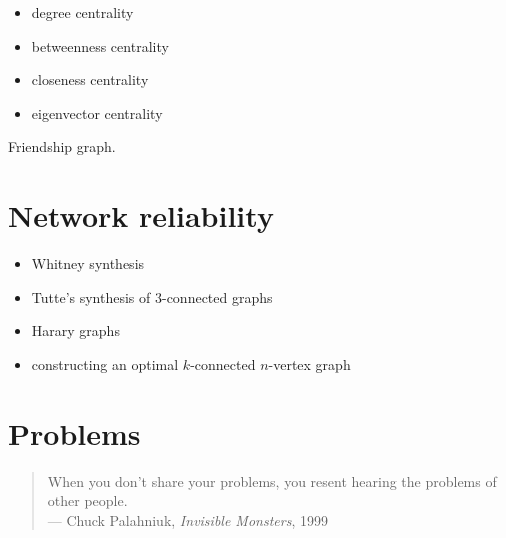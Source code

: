\begin{itemize}
\item degree centrality

\item betweenness centrality

\item closeness centrality

\item eigenvector centrality
\end{itemize}

\begin{algorithm}[!htbp]

\caption{Friendship graph.}
\label{alg:distance_connectivity:friendship_graphs}
\end{algorithm}



\section{Network reliability}

\begin{itemize}
\item Whitney synthesis

\item Tutte's synthesis of $3$-connected graphs

\item Harary graphs

\item constructing an optimal $k$-connected $n$-vertex graph
\end{itemize}



\section{Problems}

\begin{quote}
\footnotesize
When you don't share your problems, you resent hearing the problems of
other people. \\
\noindent
--- Chuck Palahniuk, \emph{Invisible Monsters}, 1999
\end{quote}

